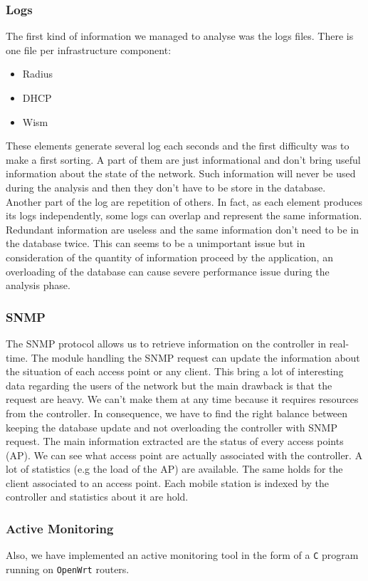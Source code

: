 \subsubsection{Logs}
The first kind of information we managed to analyse was the logs files. There is one file per infrastructure component:
\begin{itemize}
\item Radius
\item DHCP
\item Wism
\end{itemize}
These elements generate several log each seconds and the first difficulty was to make a first sorting. A part of them are just informational and don't bring useful information about the state of the network. Such information will never be used during the analysis and then they don't have to be store in the database. Another part of the log are repetition of others. In fact, as each element produces its logs independently, some logs can overlap and represent the same information. Redundant information are useless and the same information don't need to be in the database twice. This can seems to be a unimportant issue but in consideration of the quantity of information proceed by the application, an overloading of the database can cause severe performance issue during the analysis phase.

\subsubsection{SNMP}
The SNMP protocol allows us to retrieve information on the controller in real-time. The module handling the SNMP request can update the information about the situation of each access point or any client. This bring a lot of interesting data regarding the users of the network but the main drawback is that the request are heavy. We can't make them at any time because it requires resources from the controller. In consequence, we have to find the right balance between keeping the database update and not overloading the controller with SNMP request.
The main information extracted are the status of every access points (AP). We can see what access point are actually associated with the controller. A lot of statistics (e.g the load of the AP) are available.
The same holds for the client associated to an access point. Each mobile station is indexed by the controller and statistics about it are hold.

\subsubsection{Active Monitoring}
Also, we have implemented an active monitoring tool in the form of a \texttt{C} program running on \texttt{OpenWrt} routers.

